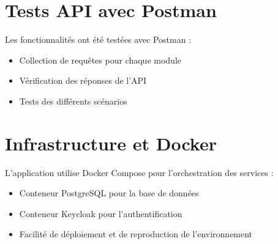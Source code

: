 \documentclass[a4paper,12pt]{article}
\begin{document}
\begin{center}
\end{center}

\section{Tests API avec Postman}

Les fonctionnalités ont été testées avec Postman :
\begin{itemize}
    \item Collection de requêtes pour chaque module
    \item Vérification des réponses de l'API
    \item Tests des différents scénarios
\end{itemize}

\begin{center}
\end{center}

\begin{center}
\end{center}

\section{Infrastructure et Docker}

L'application utilise Docker Compose pour l'orchestration des services :
\begin{itemize}
    \item Conteneur PostgreSQL pour la base de données
    \item Conteneur Keycloak pour l'authentification
    \item Facilité de déploiement et de reproduction de l'environnement
\end{itemize}

\begin{center}
\end{center}
\end{document}

